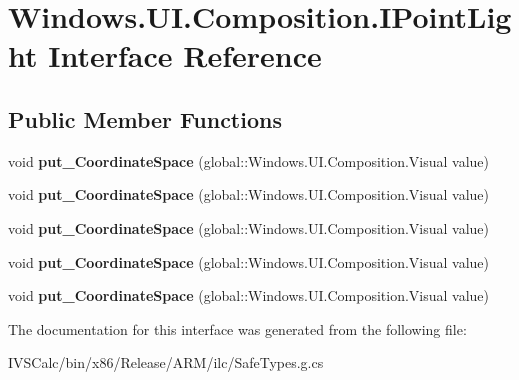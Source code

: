 \hypertarget{interface_windows_1_1_u_i_1_1_composition_1_1_i_point_light}{}\section{Windows.\+U\+I.\+Composition.\+I\+Point\+Light Interface Reference}
\label{interface_windows_1_1_u_i_1_1_composition_1_1_i_point_light}
\subsection*{Public Member Functions}
\begin{DoxyCompactItemize}
\item 
\mbox{\label{interface_windows_1_1_u_i_1_1_composition_1_1_i_point_light_aa76d4cc4478cdbaa9d5c8fbdbc33d8e3}} 
void {\bfseries put\+\_\+\+Coordinate\+Space} (global\+::\+Windows.\+U\+I.\+Composition.\+Visual value)
\item 
\mbox{\label{interface_windows_1_1_u_i_1_1_composition_1_1_i_point_light_aa76d4cc4478cdbaa9d5c8fbdbc33d8e3}} 
void {\bfseries put\+\_\+\+Coordinate\+Space} (global\+::\+Windows.\+U\+I.\+Composition.\+Visual value)
\item 
\mbox{\label{interface_windows_1_1_u_i_1_1_composition_1_1_i_point_light_aa76d4cc4478cdbaa9d5c8fbdbc33d8e3}} 
void {\bfseries put\+\_\+\+Coordinate\+Space} (global\+::\+Windows.\+U\+I.\+Composition.\+Visual value)
\item 
\mbox{\label{interface_windows_1_1_u_i_1_1_composition_1_1_i_point_light_aa76d4cc4478cdbaa9d5c8fbdbc33d8e3}} 
void {\bfseries put\+\_\+\+Coordinate\+Space} (global\+::\+Windows.\+U\+I.\+Composition.\+Visual value)
\item 
\mbox{\label{interface_windows_1_1_u_i_1_1_composition_1_1_i_point_light_aa76d4cc4478cdbaa9d5c8fbdbc33d8e3}} 
void {\bfseries put\+\_\+\+Coordinate\+Space} (global\+::\+Windows.\+U\+I.\+Composition.\+Visual value)
\end{DoxyCompactItemize}


The documentation for this interface was generated from the following file\+:\begin{DoxyCompactItemize}
\item 
I\+V\+S\+Calc/bin/x86/\+Release/\+A\+R\+M/ilc/Safe\+Types.\+g.\+cs\end{DoxyCompactItemize}
